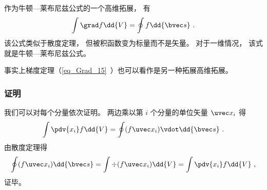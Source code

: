 

作为牛顿—莱布尼兹公式的一个高维拓展， 有
\begin{equation}\label{eq_NLext_3}
\int \grad f \dd{V} = \oint f \dd{\bvec s}~.
\end{equation}
该公式类似于散度定理， 但被积函数变为标量而不是矢量。 对于一维情况， 该式就是牛顿—莱布尼兹公式。

事实上梯度定理（\autoref{eq_Grad_15}~）也可以看作是另一种拓展高维拓展。 

\subsubsection{证明}
我们可以对每个分量依次证明。 两边乘以第 $i$ 个分量的单位矢量 $\uvec x_i$ 得
\begin{equation}
\int \pdv{x_i}f \dd{V} = \oint (f\uvec x_i) \vdot \dd{\bvec s}~.
\end{equation}
由散度定理得
\begin{equation}
\oint (f\uvec x_i) \dd{\bvec s} = \int \div (f\uvec x_i) \dd{V} = \int \pdv{x_i} f \dd{V}~,
\end{equation}
证毕。
